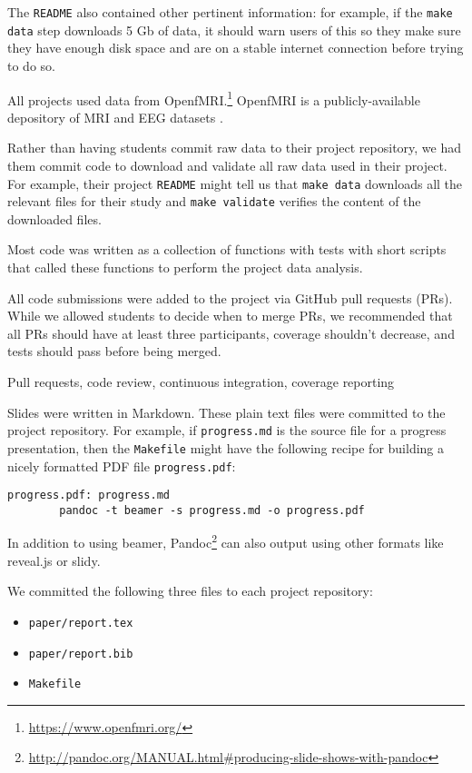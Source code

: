 The \texttt{README} also contained other pertinent information:
for example, if the \texttt{make data} step downloads 5 Gb of data, it should
warn users of this so they make sure they have enough disk space and are on a
stable internet connection before trying to do so.
 
All projects used data from OpenfMRI.\footnote{\url{https://www.openfmri.org/}}
OpenfMRI is a publicly-available depository of MRI and EEG datasets
\citep{poldrack2013toward,poldrack2015openfmri}.

Rather than having students commit raw data to their project repository, we had
them commit code to download and validate all raw data used in their project.
For example, their project \texttt{README} might tell us that \texttt{make data}
downloads all the relevant files for their study and \texttt{make validate}
verifies the content of the downloaded files.

Most code was written as a collection of functions with tests with short
scripts that called these functions to perform the project data analysis.

All code submissions were added to the project via GitHub pull requests (PRs).
While we allowed students to decide when to merge PRs, we recommended that
all PRs should have at least three participants, coverage shouldn’t decrease,
and tests should pass before being merged.

Pull requests, code review, continuous integration, coverage reporting

Slides were written in Markdown.
These plain text files were committed to the project repository.
For example, if \texttt{progress.md} is the source file for a progress presentation,
then the \texttt{Makefile} might have the following recipe for building a nicely
formatted PDF file \texttt{progress.pdf}:
\begin{verbatim}
progress.pdf: progress.md
        pandoc -t beamer -s progress.md -o progress.pdf
\end{verbatim}

In addition to using beamer,
Pandoc\footnote{\url{http://pandoc.org/MANUAL.html\#producing-slide-shows-with-pandoc}}
can also output using other formats like reveal.js or slidy.

We committed the following three files to each project repository:
\begin{itemize}
\item \texttt{paper/report.tex}
\item \texttt{paper/report.bib}
\item \texttt{Makefile}
\end{itemize}

